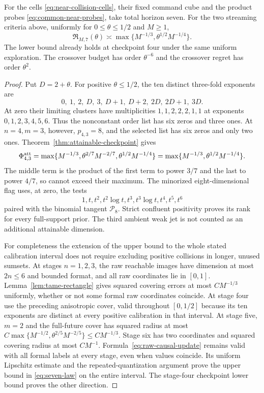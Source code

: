 \begin{corollary}\label{cor:seven-trial}
For the cells \eqref{eq:near-collision-cells}, their fixed command cube
and the product probes \eqref{eq:common-near-probes}, take total horizon
seven. For the two streaming criteria above, uniformly for
$0\le\theta\le1/2$ and $M\ge1$,
\begin{equation}\label{eq:seven-law}
 \mathfrak R_{M,7}(\theta)\asymp
    \max\{M^{-1/3},\theta^{1/2}M^{-1/4}\}.
\end{equation}
The lower bound already holds at checkpoint four under the same uniform
exploration. The crossover budget has order $\theta^{-6}$ and the
crossover regret has order $\theta^2$.
\end{corollary}
\begin{proof}
Put $D=2+\theta$. For positive $\theta\le1/2$, the ten distinct
three-fold exponents are
\[
 0,\ 1,\ 2,\ D,\ 3,\ D+1,\ D+2,\ 2D,\ 2D+1,\ 3D.
\]
At zero their limiting clusters have multiplicities
$1,1,2,2,2,1,1$ at exponents $0,1,2,3,4,5,6$.
Thus the nonconstant order list has six zeros and three ones.
At $n=4,m=3$, however, $p_{4,3}=8$, and the selected list has six
zeros and only two ones. Theorem~\ref{thm:attainable-checkpoint} gives
\[
 \Phi^{\rm att}_{4,3}
 =\max\{M^{-1/3},\theta^{2/7}M^{-2/7},
                         \theta^{1/2}M^{-1/4}\}
 =\max\{M^{-1/3},\theta^{1/2}M^{-1/4}\}.
\]
The middle term is the product of the first term to power $3/7$ and
the last to power $4/7$, so cannot exceed their maximum. The minorized
eight-dimensional flag uses, at zero, the tests
\[
 1,t,t^2,t^2\log t,t^3,t^3\log t,t^4,t^5,t^6
\]
paired with the binomial tangent $\mathcal P_8$. Strict confluent
positivity proves its rank for every full-support prior. The third
ambient weak jet is not counted as an additional attainable dimension.

For completeness the extension of the upper bound to the whole stated
calibration interval does not require excluding positive collisions in
longer, unused sumsets. At stages $n=1,2,3$, the raw reachable images
have dimension at most $2n\le6$ and bounded format, and all raw
coordinates lie in $[0,1]$. Lemma~\ref{lem:tame-rectangle} gives
squared covering errors at most $CM^{-1/3}$ uniformly, whether or not
some formal raw coordinates coincide. At stage four use the preceding
anisotropic cover, valid throughout $[0,1/2]$ because its ten exponents
are distinct at every positive calibration in that interval. At stage
five, $m=2$ and the full-future cover has squared radius at most
$C\max\{M^{-1/2},\theta^{2/5}M^{-2/5}\}\le CM^{-1/3}$.
Stage six has two coordinates and squared covering radius at most
$CM^{-1}$. Formula~\eqref{eq:raw-causal-update} remains valid with
all formal labels at every stage, even when values coincide. Its uniform
Lipschitz estimate and the repeated-quantization argument prove the upper
bound in \eqref{eq:seven-law} on the entire interval. The stage-four
checkpoint lower bound proves the other direction.


\end{proof}
